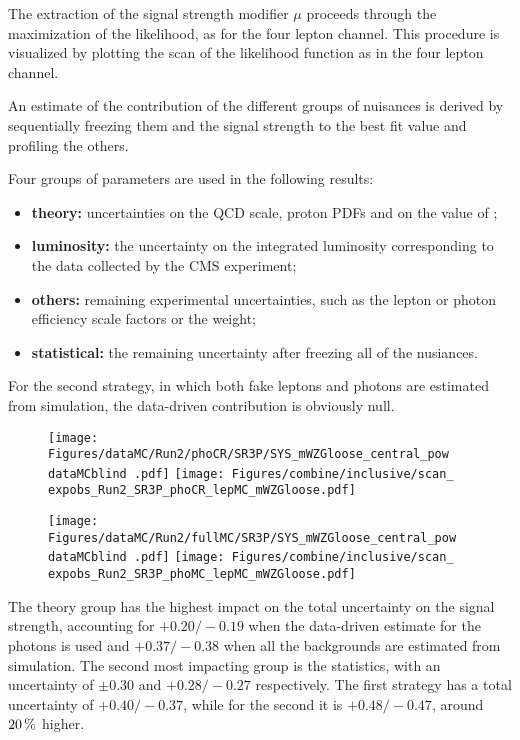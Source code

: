 The extraction of the signal strength modifier $\mu$ proceeds through the maximization of the likelihood,
as for the four lepton channel.
This procedure is visualized by plotting the scan of the likelihood function as in the four lepton channel.

An estimate of the contribution of the different groups of nuisances is derived
by sequentially freezing them and the signal strength to the best fit value
and profiling the others.

Four groups of parameters are used in the following results:
\begin{itemize}
\item \textbf{theory:} uncertainties on the QCD scale, proton PDFs and on the value of \alpS;
\item \textbf{luminosity:} the uncertainty on the integrated luminosity corresponding to the data collected by the CMS experiment;
\item \textbf{others:} remaining experimental uncertainties, such as the lepton or photon efficiency scale factors or the \pileup{} weight;
\item \textbf{statistical:} the remaining uncertainty after freezing all of the nusiances.
\end{itemize}

For the second strategy, in which both fake leptons and photons are estimated from simulation,
the data-driven contribution is obviously null.

\begin{figure}
  \centering
  \texttt{[image: Figures/dataMC/Run2/phoCR/SR3P/SYS\_mWZGloose\_central\_pow\\dataMCblind .pdf]}
  \hfill
  \texttt{[image: Figures/combine/inclusive/scan\_\\expobs\_Run2\_SR3P\_phoCR\_lepMC\_mWZGloose.pdf]}
  \caption{}
  \label{fig:scan_Run2_SR3P_phoCR_lepMC_mWZGloose}
\end{figure}

\begin{figure}
  \centering
  \texttt{[image: Figures/dataMC/Run2/fullMC/SR3P/SYS\_mWZGloose\_central\_pow\\dataMCblind .pdf]}
  \hfill
  \texttt{[image: Figures/combine/inclusive/scan\_\\expobs\_Run2\_SR3P\_phoMC\_lepMC\_mWZGloose.pdf]}
  \caption{}
  \label{fig:scan_Run2_SR4P_phoMC_lepMC_mWZGloose}
\end{figure}

The theory group has the highest impact on the total uncertainty on the signal strength,
accounting for ${+}0.20/{-}0.19$ when the data-driven estimate for the \nonprompt photons is used
and ${+}0.37/{-}0.38$ when all the backgrounds are estimated from simulation.
The second most impacting group is the statistics, with an uncertainty of
$\pm 0.30$ and ${+}0.28/{-}0.27$ respectively.
The first strategy has a total uncertainty of ${+}0.40/{-}0.37$,
while for the second it is ${+}0.48/{-}0.47$,
around $20\usep\%$ higher.

